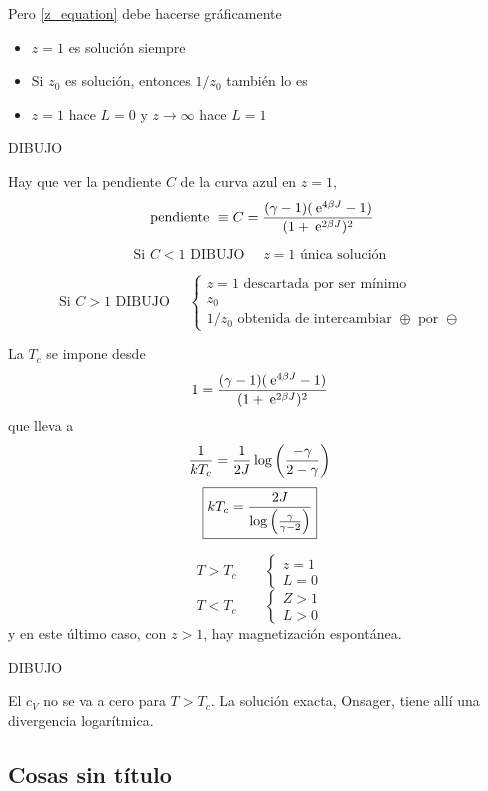 \documentclass[10pt,oneside]{CBFT_book}
\begin{document}
Pero \eqref{z_equation} debe hacerse gráficamente
\begin{itemize}
 \item $z=1$ es solución siempre 
 \item Si $z_0$ es solución, entonces $1/z_0$ también lo es
 \item $z=1$ hace $L=0$ y $z\to\infty$ hace $L=1$
\end{itemize}

DIBUJO

Hay que ver la pendiente $C$ de la curva azul en $z=1$,
\[
	\text{ pendiente } \equiv C = \frac{(\gamma - 1)(\:\mathrm{e}^{4\beta J}-1)}{(1+\:\mathrm{e}^{2\beta J})^2}
\]

\[
	\text{ Si } C<1 \text{ DIBUJO } \quad z = 1 \text{ única solución }
\]

\[
	\text{ Si } C>1 \text{ DIBUJO } \quad \begin{cases}
	                                       z = 1 \text{ descartada por ser mínimo} \\
	                                       z_0 \\
	                                       1/z_0 \text{ obtenida de intercambiar $\oplus$ por $\ominus$}
	                                      \end{cases}
\]

La $T_c$ se impone desde
\[
	1 =  \frac{(\gamma - 1)(\:\mathrm{e}^{4\beta J}-1)}{(1+\:\mathrm{e}^{2\beta J})^2}
\]
que lleva a 
\[
	\frac{1}{kT_c} = \frac{1}{2J} \log \left( \frac{ -\gamma }{ 2-\gamma } \right) 
\]
\[ 
	\boxed{ kT_c = \frac{2J}{\log \left( \frac{ \gamma }{ \gamma -2  } \right) }}
\]

\[
	T > T_c \qquad \begin{cases}
	                z = 1 \\
	                L = 0
	               \end{cases}
\]
\[
	T < T_c \qquad \begin{cases}
	                Z > 1 \\
	                L>0
	               \end{cases}
\]
y en este último caso, con $z>1$, hay magnetización espontánea.

DIBUJO

El $c_V$ no se va a cero para $T>T_c$.
La solución exacta, Onsager, tiene allí una divergencia logarítmica.

\subsection{Cosas sin título}
\end{document}
